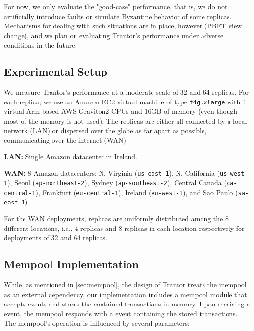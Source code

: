 \documentclass{article}
\begin{document}
For now, we only evaluate the "good-case" performance, that is, we do not artificially introduce faults or simulate Byzantine behavior of some replicas.
Mechanisms for dealing with such situations are in place, however (PBFT view change),
and we plan on evaluating Trantor's performance under adverse conditions in the future.

\subsection{Experimental Setup}

We measure Trantor's performance at a moderate scale of 32 and 64 replicas.
For each replica, we use an Amazon EC2 virtual machine of type \texttt{t4g.xlarge}
with 4 virtual Arm-based AWS Graviton2 CPUs and 16GB of memory (even though most of the memory is not used).
The replicas are either all connected by a local network (LAN) or dispersed over the globe as far apart as possible, communicating over the internet (WAN):
\begin{compactitem}
    \item \textbf{LAN:} Single Amazon datacenter in Ireland.
    \item \textbf{WAN:} 8 Amazon datacenters:
    N. Virginia (\texttt{us-east-1}),
    N. California (\texttt{us-west-1}),
    Seoul (\texttt{ap-northeast-2}),
    Sydney (\texttt{ap-southeast-2}),
    Central Canada (\texttt{ca-central-1}),
    Frankfurt (\texttt{eu-central-1}),
    Ireland (\texttt{eu-west-1}),
    and Sao Paulo (\texttt{sa-east-1}).
\end{compactitem}
For the WAN deployments, replicas are uniformly distributed among the 8 different locations,
i.e., 4 replicas and 8 replicas in each location respectively for deployments of 32 and 64 replicas.

\subsection{Mempool Implementation}

While, as mentioned in \cref{sec:mempool}, the design of Trantor treats the mempool as an external dependency,
our implementation includes a mempool module that accepts  events and stores the contained transactions in memory.
Upon receiving a  event, the mempool responds with a  event containing the stored transactions.
The mempool's operation is influenced by several parameters:
\end{document}

